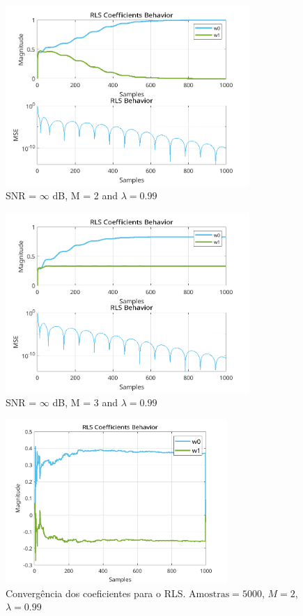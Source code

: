 \documentclass[a4paper,10pt]{article}
\begin{document}
\begin{enumerate}
				\begin{figure}[H]
					\centering
					\includegraphics[width=0.825\textwidth]{figs/L4Q3_rls_mse_2_inf_99.png}
					\caption{SNR = $\infty$ dB, M = 2 and $\lambda = 0.99$}
					\label{fig:L4Q3_a7}
				\end{figure}

				\begin{figure}[H]
					\centering
					\includegraphics[width=0.825\textwidth]{figs/L4Q3_rls_mse_3_inf_99.png}
					\caption{SNR = $\infty$ dB, M = 3 and $\lambda = 0.99$}
					\label{fig:L4Q3_a8}
				\end{figure}

				\begin{figure}[H]
					\centering
					\includegraphics[width=0.75\textwidth]{figs/rls_coefficients.png}
					\caption{Convergência dos coeficientes para o RLS. $\text{Amostras} = 5000$, $M = 2$, $\lambda = 0.99$}
					\label{fig:rls_coefficient}
				\end{figure}


\end{enumerate}
\end{document}
